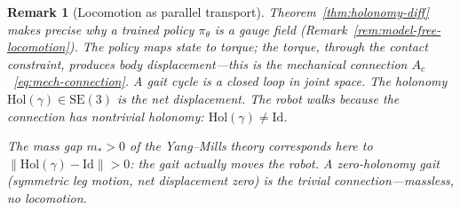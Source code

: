 \documentclass[11pt,a4paper]{article}
\newtheorem{remark}[theorem]{Remark}
\newcommand{\norm}[1]{\lVert #1 \rVert}
\begin{document}
\begin{remark}[Locomotion as parallel transport]
\label{rem:locomotion-parallel-transport}
Theorem~\ref{thm:holonomy-diff} makes precise
why a trained policy $\pi_\theta$ is a gauge field
(Remark~\ref{rem:model-free-locomotion}).
The policy maps state to torque;
the torque, through the contact constraint,
produces body displacement---this is
the mechanical connection $A_c$~\eqref{eq:mech-connection}.
A gait cycle is a closed loop in joint space.
The holonomy $\mathrm{Hol}(\gamma) \in \mathrm{SE}(3)$
is the net displacement.
The robot walks \emph{because} the connection
has nontrivial holonomy:
$\mathrm{Hol}(\gamma) \neq \mathrm{Id}$.

\medskip\noindent
The mass gap $m_* > 0$ of the Yang--Mills theory
corresponds here to
$\norm{\mathrm{Hol}(\gamma) - \mathrm{Id}} > 0$:
the gait actually moves the robot.
A zero-holonomy gait
(symmetric leg motion, net displacement zero)
is the trivial connection---massless,
no locomotion.
\end{remark}
\end{document}
